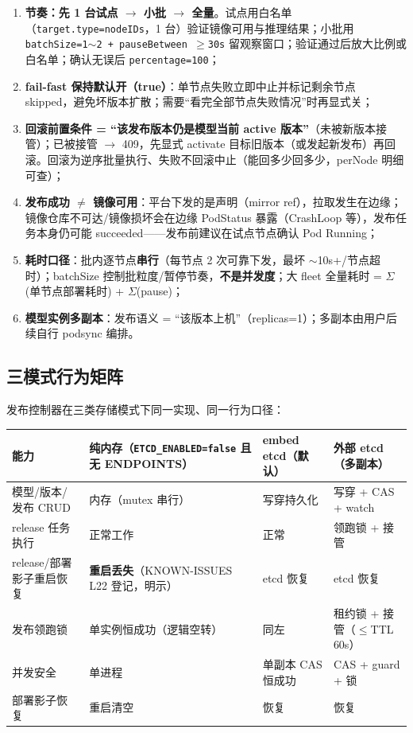 \begin{enumerate}
  \item \textbf{节奏：先 1 台试点 $\rightarrow$ 小批 $\rightarrow$ 全量}。试点用白名单（\texttt{target.type=nodeIDs}，1 台）验证镜像可用与推理结果；小批用 \texttt{batchSize=1$\sim$2 + pauseBetween $\geq$30s} 留观察窗口；验证通过后放大比例或白名单；确认无误后 \texttt{percentage=100}；
  \item \textbf{fail-fast 保持默认开（true）}：单节点失败立即中止并标记剩余节点 skipped，避免坏版本扩散；需要“看完全部节点失败情况”时再显式关；
  \item \textbf{回滚前置条件 = “该发布版本仍是模型当前 active 版本”}（未被新版本接管）；已被接管 $\rightarrow$ 409，先显式 activate 目标旧版本（或发起新发布）再回滚。回滚为逆序批量执行、失败不回滚中止（能回多少回多少，perNode 明细可查）；
  \item \textbf{发布成功 $\neq$ 镜像可用}：平台下发的是声明（mirror ref），拉取发生在边缘；镜像仓库不可达/镜像损坏会在边缘 PodStatus 暴露（CrashLoop 等），发布任务本身仍可能 succeeded——发布前建议在试点节点确认 Pod Running；
  \item \textbf{耗时口径}：批内逐节点\textbf{串行}（每节点 2 次可靠下发，最坏 $\sim$10s+/节点超时）；batchSize 控制批粒度/暂停节奏，\textbf{不是并发度}；大 fleet 全量耗时 = $\Sigma$(单节点部署耗时) + $\Sigma$(pause)；
  \item \textbf{模型实例多副本}：发布语义 = “该版本上机”（replicas=1）；多副本由用户后续自行 podsync 编排。
\end{enumerate}

\subsection{三模式行为矩阵}
\label{sec:model-api-matrix}

发布控制器在三类存储模式下同一实现、同一行为口径：

\begin{tabularx}{\textwidth}{l X X X}
  \toprule
  \textbf{能力} & \textbf{纯内存（\texttt{ETCD\_ENABLED=false} 且无 ENDPOINTS）} & \textbf{embed etcd（默认）} & \textbf{外部 etcd（多副本）} \\
  \midrule
  模型/版本/发布 CRUD & 内存（mutex 串行） & 写穿持久化 & 写穿 + CAS + watch \\
  release 任务执行 & 正常工作 & 正常 & 领跑锁 + 接管 \\
  release/部署影子重启恢复 & \textbf{重启丢失}（KNOWN-ISSUES L22 登记，明示） & etcd 恢复 & etcd 恢复 \\
  发布领跑锁 & 单实例恒成功（逻辑空转） & 同左 & 租约锁 + 接管（$\leq$TTL 60s） \\
  并发安全 & 单进程 & 单副本 CAS 恒成功 & CAS + guard + 锁 \\
  部署影子恢复 & 重启清空 & 恢复 & 恢复 \\
  \bottomrule
\end{tabularx}


